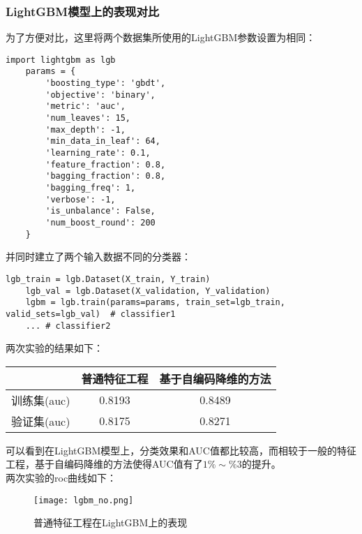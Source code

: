 \subsubsection{LightGBM模型上的表现对比}
为了方便对比，这里将两个数据集所使用的LightGBM参数设置为相同：

\begin{lstlisting}[frame=shadowbox]
    import lightgbm as lgb
    params = {
        'boosting_type': 'gbdt',
        'objective': 'binary',
        'metric': 'auc',
        'num_leaves': 15,
        'max_depth': -1,
        'min_data_in_leaf': 64,
        'learning_rate': 0.1,
        'feature_fraction': 0.8,
        'bagging_fraction': 0.8,
        'bagging_freq': 1,
        'verbose': -1,
        'is_unbalance': False,
        'num_boost_round': 200
    }
\end{lstlisting}

并同时建立了两个输入数据不同的分类器：

\begin{lstlisting}[frame=shadowbox]
    lgb_train = lgb.Dataset(X_train, Y_train)
    lgb_val = lgb.Dataset(X_validation, Y_validation)
    lgbm = lgb.train(params=params, train_set=lgb_train, valid_sets=lgb_val)  # classifier1
    ... # classifier2
\end{lstlisting}

两次实验的结果如下：\\

\begin{center}
    \begin{tabular}{ccc}
        \hline
                    & 普通特征工程 & 基于自编码降维的方法 \\
        \hline
        训练集(auc) & 0.8193       & 0.8489               \\
        \hline
        验证集(auc) & 0.8175       & 0.8271               \\
        \hline
    \end{tabular}
\end{center}

可以看到在LightGBM模型上，分类效果和AUC值都比较高，而相较于一般的特征工程，基于自编码降维的方法使得AUC值有了$1\%\sim\%3$的提升。\\

两次实验的roc曲线如下：
\begin{figure}[H]
    \centering
    \texttt{[image: lgbm\_no.png]}
    \caption{普通特征工程在LightGBM上的表现}
    \label{fig:lgbm_no}
\end{figure}

